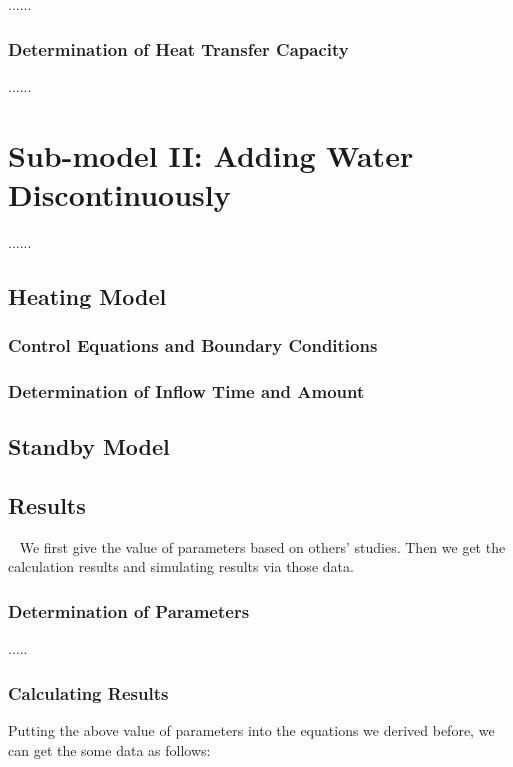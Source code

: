 \documentclass{mcmthesis}
\begin{document}
......

\subsubsection{Determination of Heat Transfer Capacity}

......

\section{Sub-model II: Adding Water Discontinuously}

......

\subsection{Heating Model}

\subsubsection{Control Equations and Boundary Conditions}

\subsubsection{Determination of Inflow Time and Amount}

\subsection{Standby Model}

\subsection{Results}

\quad~ We first give the value of parameters based on others’ studies. Then we 
get the calculation results and simulating results via those data.

\subsubsection{Determination of Parameters}
.....

\subsubsection{Calculating Results}

Putting the above value of parameters into the equations we derived before, we 
can get the some data as follows:
\end{document}
